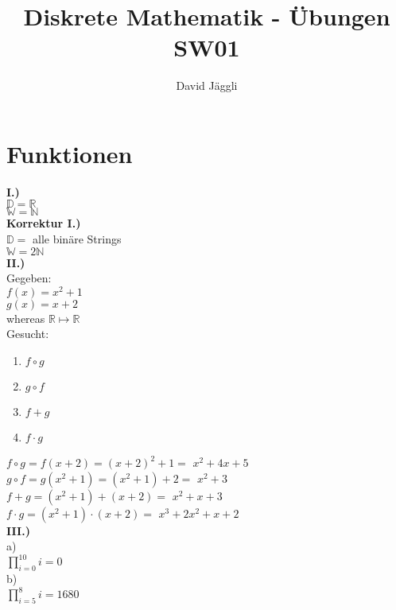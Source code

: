 \documentclass[12pt]{scrartcl}
\author{David Jäggli}
\title{Diskrete Mathematik - Übungen SW01}
\begin{document}
\maketitle

\tableofcontents

\newpage
\section{Funktionen}
\textbf{I.)}\\
$\mathbb{D} = \mathbb{R}$\\
$\mathbb{W} = \mathbb{N}$\\

\textbf{Korrektur I.)}\\
$\mathbb{D} =$ alle binäre Strings\\
$\mathbb{W} = 2\mathbb{N}$\\


\textbf{II.)}\\
Gegeben:\\
$f(x) = x^2 + 1$\\
$g(x) = x + 2$\\
whereas $\mathbb{R} \mapsto \mathbb{R}$\\

Gesucht:
\begin{enumerate}
    \item $f \circ g$
    \item $g \circ f$
    \item $f + g$
    \item $f \cdot g$\\
\end{enumerate}

$f \circ g = f(x + 2) = (x + 2)^2 + 1 =$ \underline{$x^2 + 4x + 5$}\\
$g \circ f = g(x^2 + 1) = (x^2 + 1) + 2 =$ \underline{$x^2 + 3$}\\
$f + g = (x^2 + 1) + (x + 2) =$ \underline{$x^2 + x + 3$}\\
$f \cdot g = (x^2 + 1) \cdot (x + 2) =$ \underline{$x^3 + 2x^2 + x + 2$}\\


\textbf{III.)}\\
a)\\
$\displaystyle{\prod_{i=0}^{10} i} = 0$\\

b)\\

$\displaystyle{\prod_{i=5}^{8} i} = 1680$\\
\end{document}
